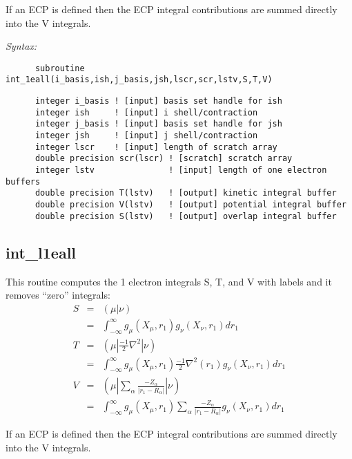 If an ECP is defined then the ECP integral contributions are summed  
directly into the V integrals.   
 
{\it Syntax:} 
\begin{verbatim} 
      subroutine int_1eall(i_basis,ish,j_basis,jsh,lscr,scr,lstv,S,T,V) 
\end{verbatim} 
\begin{verbatim}  
      integer i_basis ! [input] basis set handle for ish 
      integer ish     ! [input] i shell/contraction 
      integer j_basis ! [input] basis set handle for jsh 
      integer jsh     ! [input] j shell/contraction 
      integer lscr    ! [input] length of scratch array 
      double precision scr(lscr) ! [scratch] scratch array 
      integer lstv               ! [input] length of one electron buffers 
      double precision T(lstv)   ! [output] kinetic integral buffer 
      double precision V(lstv)   ! [output] potential integral buffer 
      double precision S(lstv)   ! [output] overlap integral buffer 
\end{verbatim} 
 
\subsection{int\_l1eall} 
This routine computes the 1 electron integrals S, T, and V  
with labels and it removes ``zero'' integrals: 
\begin{eqnarray*}  
S & = & ({\mu}|{\nu}) \\ 
  & = & \int_{{-}\infty}^{\infty} g_{\mu}(X_{\mu},r_{1})g_{\nu}(X_{\nu},r_{1})dr_{1} \\ 
T & = & ({\mu}|\frac{-1}{2}{\nabla^{2}}|{\nu}) \\ 
  & = & \int_{-\infty}^{\infty} g_{\mu}(X_{\mu},r_{1})\frac{-1}{2}{\nabla^{2}}(r_{1})g_{\nu}(X_{\nu},r_{1})dr_{1} \\ 
V & = & ({\mu}|\sum_{\alpha}\frac{-Z_{\alpha}}{|r_{1}-R_{\alpha}|}|{\nu}) \\ 
  & = & \int_{-\infty}^{\infty}g_{\mu}(X_{\mu},r_{1})\sum_{\alpha}\frac{-Z_{\alpha}} 
{|r_{1}-R_{\alpha}|}g_{\nu}(X_{\nu},r_{1})dr_{1} 
\end{eqnarray*}  
 
If an ECP is defined then the ECP integral contributions are summed  
directly into the V integrals.   
 

